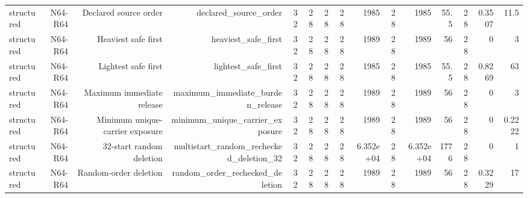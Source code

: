 {\begin{longtable}{lrrrrrrrrrrrrrr}
structured & N64-R64 & Declared source order & declared\_source\_order & 32 & 28 & 28 & 28 & 1985 & 28 & 1985 & 55.5 & 28 & 0.3507 & 11.5 \\
structured & N64-R64 & Heaviest safe first & heaviest\_safe\_first & 32 & 28 & 28 & 28 & 1989 & 28 & 1989 & 56 & 28 & 0 & 3 \\
structured & N64-R64 & Lightest safe first & lightest\_safe\_first & 32 & 28 & 28 & 28 & 1985 & 28 & 1985 & 55.5 & 28 & 0.8269 & 63 \\
structured & N64-R64 & Maximum immediate release & maximum\_immediate\_burden\_release & 32 & 28 & 28 & 28 & 1989 & 28 & 1989 & 56 & 28 & 0 & 3 \\
structured & N64-R64 & Minimum unique-carrier exposure & minimum\_unique\_carrier\_exposure & 32 & 28 & 28 & 28 & 1989 & 28 & 1989 & 56 & 28 & 0 & 0.2222 \\
structured & N64-R64 & 32-start random deletion & multistart\_random\_rechecked\_deletion\_32 & 32 & 28 & 28 & 28 & 6.352e+04 & 28 & 6.352e+04 & 1776 & 28 & 0 & 1 \\
structured & N64-R64 & Random-order deletion & random\_order\_rechecked\_deletion & 32 & 28 & 28 & 28 & 1989 & 28 & 1989 & 56 & 28 & 0.3229 & 17 \\
\bottomrule
\end{longtable}
}
